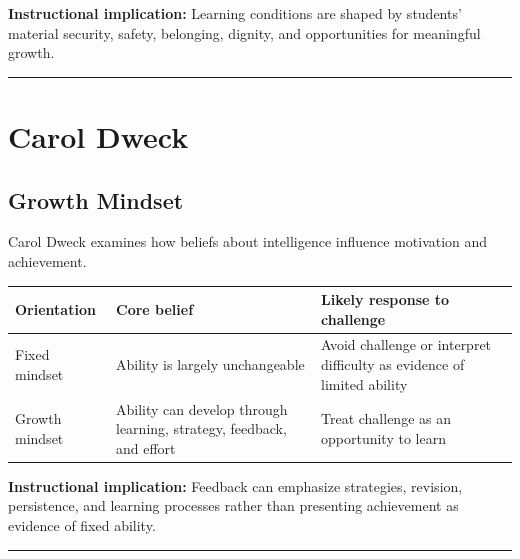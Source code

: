 \documentclass[
  letterpaper,
  DIV=11,
  numbers=noendperiod]{scrartcl}
\begin{document}
\textbf{Instructional implication:} Learning conditions are shaped by
students' material security, safety, belonging, dignity, and
opportunities for meaningful growth.

\begin{center}\rule{0.5\linewidth}{0.5pt}\end{center}

\section{Carol Dweck}\label{carol-dweck}

\subsection{Growth Mindset}\label{growth-mindset}

Carol Dweck examines how beliefs about intelligence influence motivation
and achievement.

\begin{longtable}[]{@{}
  >{\raggedright\arraybackslash}p{}
  >{\raggedright\arraybackslash}p{}
  >{\raggedright\arraybackslash}p{}@{}}
\toprule\noalign{}
\begin{minipage}[b]{\linewidth}\raggedright
Orientation
\end{minipage} & \begin{minipage}[b]{\linewidth}\raggedright
Core belief
\end{minipage} & \begin{minipage}[b]{\linewidth}\raggedright
Likely response to challenge
\end{minipage} \\
\midrule\noalign{}
\endhead
\bottomrule\noalign{}
\endlastfoot
Fixed mindset & Ability is largely unchangeable & Avoid challenge or
interpret difficulty as evidence of limited ability \\
Growth mindset & Ability can develop through learning, strategy,
feedback, and effort & Treat challenge as an opportunity to learn \\
\end{longtable}

\textbf{Instructional implication:} Feedback can emphasize strategies,
revision, persistence, and learning processes rather than presenting
achievement as evidence of fixed ability.

\begin{center}\rule{0.5\linewidth}{0.5pt}\end{center}
\end{document}
